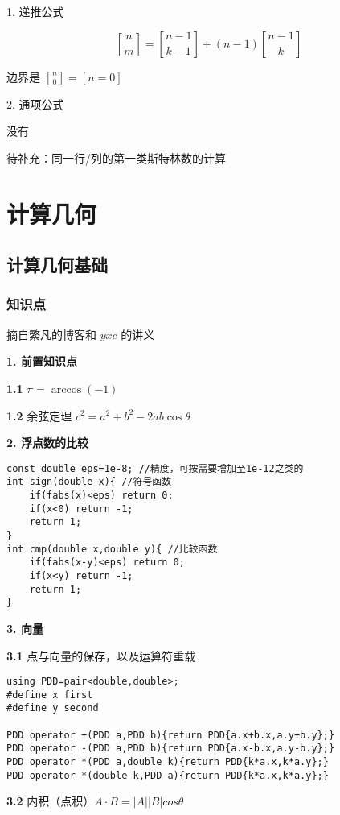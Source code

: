 \documentclass[12pt]{article}
\begin{document}
1. 递推公式

$$
{n\brack m}={n-1\brack k-1}+(n-1){n-1\brack k}
$$

边界是 ${n\brack 0}=[n=0]$

2. 通项公式

\centerline{没有}

待补充：同一行/列的第一类斯特林数的计算

\newpage

{\centering\section{计算几何}}

\subsection{计算几何基础}

\subsubsection{知识点} %

摘自繁凡的博客和 $yxc$ 的讲义

\textbf{1. 前置知识点}

\textbf{1.1} $\pi=\arccos(-1)$
	
\textbf{1.2} 余弦定理 $c^2=a^2+b^2-2ab\cos\theta$

\textbf{2. 浮点数的比较}

\begin{lstlisting}[style=C++]
const double eps=1e-8; //精度，可按需要增加至1e-12之类的
int sign(double x){ //符号函数
	if(fabs(x)<eps) return 0;
	if(x<0) return -1;
	return 1;
}
int cmp(double x,double y){ //比较函数
	if(fabs(x-y)<eps) return 0;
	if(x<y) return -1;
	return 1;
}
\end{lstlisting}


\textbf{3. 向量}

\textbf{3.1} 点与向量的保存，以及运算符重载

\begin{lstlisting}[style=C++]
using PDD=pair<double,double>;
#define x first
#define y second

PDD operator +(PDD a,PDD b){return PDD{a.x+b.x,a.y+b.y};}
PDD operator -(PDD a,PDD b){return PDD{a.x-b.x,a.y-b.y};}
PDD operator *(PDD a,double k){return PDD{k*a.x,k*a.y};}
PDD operator *(double k,PDD a){return PDD{k*a.x,k*a.y};}
\end{lstlisting}

\textbf{3.2} 内积（点积）$A\cdot B = |A||B|cos\theta$
\end{document}
